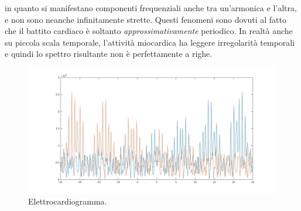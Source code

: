 \documentclass[12pt,oneside,openany]{memoir}
\numberwithin{equation}{subsection}
\begin{document}
in quanto si manifestano componenti frequenziali anche tra un'armonica e
l'altra, e non sono neanche infinitamente strette. Questi fenomeni sono dovuti
al fatto che il battito cardiaco \`e soltanto \textit{approssimativamente}
periodico. In realt\`a anche su piccola scala temporale, l'attivit\`a miocardica
ha leggere irregolarit\`a temporali e quindi lo spettro risultante non \`e
perfettamente a righe.
\begin{figure}[H]
	\centering
	\captionsetup{justification=centering}
	\includegraphics[width=1.0\textwidth]{images/matlab_ecg_spectrum.jpg}
	\caption{Elettrocardiogramma.}
\end{figure}


\newpage
\end{document}
